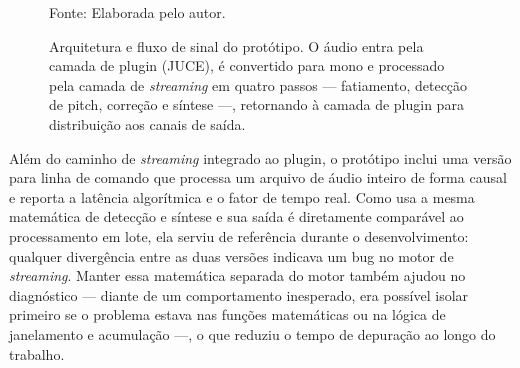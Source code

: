 \begin{figure}[H]
\centering
{}
\caption{\label{fig:arquitetura}Arquitetura e fluxo de sinal do protótipo. O áudio entra pela camada de plugin (JUCE), é convertido para mono e processado pela camada de \textit{streaming} em quatro passos --- fatiamento, detecção de pitch, correção e síntese ---, retornando à camada de plugin para distribuição aos canais de saída.}
\small Fonte: Elaborada pelo autor.
\end{figure}

Além do caminho de \textit{streaming} integrado ao plugin, o protótipo inclui uma versão para linha de comando que processa um arquivo de áudio inteiro de forma causal e reporta a latência algorítmica e o fator de tempo real. Como usa a mesma matemática de detecção e síntese e sua saída é diretamente comparável ao processamento em lote, ela serviu de referência durante o desenvolvimento: qualquer divergência entre as duas versões indicava um bug no motor de \textit{streaming}. Manter essa matemática separada do motor também ajudou no diagnóstico --- diante de um comportamento inesperado, era possível isolar primeiro se o problema estava nas funções matemáticas ou na lógica de janelamento e acumulação ---, o que reduziu o tempo de depuração ao longo do trabalho.

